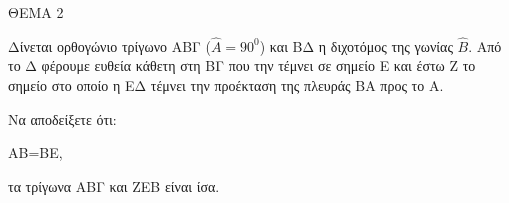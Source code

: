 
ΘΕΜΑ 2

Δίνεται ορθογώνιο τρίγωνο ΑΒΓ ($\widehat{Α} = 90^{0}$) και ΒΔ η διχοτόμος της γωνίας $\widehat{Β}$. Από το Δ φέρουμε ευθεία κάθετη στη ΒΓ που την τέμνει σε σημείο Ε και έστω Ζ το σημείο στο οποίο η ΕΔ τέμνει την προέκταση της πλευράς ΒΑ προς το A.

Να αποδείξετε ότι:

\begin{alist}
\item ΑΒ=ΒΕ, 

\item τα τρίγωνα ΑΒΓ και ΖΕΒ είναι ίσα. 
\end{alist}
